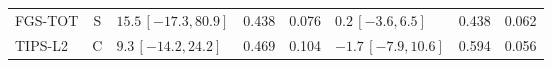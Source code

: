 \begin{longtable}{lcp{37mm}rrp{37mm}rr}
FGS-TOT & S & \(15.5\,[-17.3,80.9]\) & 0.438 & 0.076 & \(0.2\,[-3.6,6.5]\) & 0.438 & 0.062\\
TIPS-L2 & C & \(9.3\,[-14.2,24.2]\) & 0.469 & 0.104 & \(-1.7\,[-7.9,10.6]\) & 0.594 & 0.056\\

\end{longtable}

